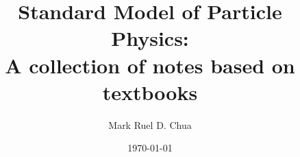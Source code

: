 \documentclass[b5paper,11pt]{book}
\begin{document}
\author{Mark Ruel D. Chua}
\title{Standard Model of Particle Physics: \\ A collection of notes based on textbooks}
\date{\today}

\frontmatter
\maketitle

\tableofcontents

\mainmatter





\backmatter
\end{document}
